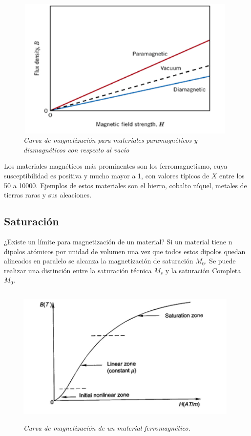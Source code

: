 \begin{figure}[htb]
\begin{center}
\centering
	\includegraphics[width=11cm, height=7cm]{images/Capitulo_1/Curva_de_magnetizacion}
	\caption{\textit{Curva de magnetización para materiales paramagnéticos y diamagnéticos con respecto al vacío}}
	\label{fig:system:example1}	
\end{center}
\end{figure}

Los materiales magnéticos más prominentes son los ferromagnetismo, cuya susceptibilidad es positiva y mucho mayor a 1, con valores típicos de $X$ entre los 50 a 10000. Ejemplos de estos materiales son el hierro, cobalto níquel, metales de tierras raras y sus aleaciones.

\subsection{Saturación}
¿Existe un límite para magnetización de un material?
Si un material tiene n dipolos atómicos por unidad de volumen una vez que todos estos dipolos quedan alineados en paralelo se alcanza la magnetización de saturación $M_0$. Se puede realizar una distinción entre la saturación técnica $M_s$  y la saturación Completa $M_0$. 

\begin{figure}[htb]
\begin{center}
\centering
	\includegraphics[width=11cm, height=7cm]{images/Capitulo_1/Curva_de_magnetizacion_de_un_material_ferromagnetico}
	\caption{\textit{Curva de magnetización de un material ferromagnético.}}
	\label{fig:system:example1}	
\end{center}
\end{figure}

